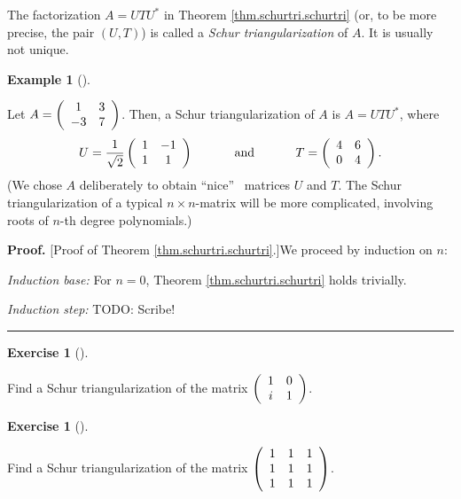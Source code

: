 \documentclass[numbers=enddot,12pt,final,onecolumn,notitlepage]{scrartcl}%
\newcounter{exer}
\numberwithin{exer}{subsection}
\theoremstyle{definition}
\newtheorem{exam}[theo]{Example}
\newenvironment{example}[1][]
{\begin{exam}[#1]\begin{leftbar}}
{\end{leftbar}\end{exam}}
\newtheorem{exmp}[exer]{Exercise}
\newenvironment{exercise}[1][]
{\begin{exmp}[#1]\begin{leftbar}}
{\end{leftbar}\end{exmp}}
\newenvironment{proof}[1][Proof]{\noindent\textbf{#1.} }{\ \rule{0.5em}{0.5em}}
\begin{document}
The factorization $A=UTU^{\ast}$ in Theorem \ref{thm.schurtri.schurtri} (or,
to be more precise, the pair $\left(  U,T\right)  $) is called a \emph{Schur
triangularization} of $A$. It is usually not unique.

\begin{example}
Let $A=\left(
\begin{array}
[c]{cc}%
1 & 3\\
-3 & 7
\end{array}
\right)  $. Then, a Schur triangularization of $A$ is $A=UTU^{\ast}$, where%
\[
U=\dfrac{1}{\sqrt{2}}\left(
\begin{array}
[c]{cc}%
1 & -1\\
1 & 1
\end{array}
\right)  \ \ \ \ \ \ \ \ \ \ \text{and}\ \ \ \ \ \ \ \ \ \ T=\left(
\begin{array}
[c]{cc}%
4 & 6\\
0 & 4
\end{array}
\right)  .
\]
(We chose $A$ deliberately to obtain \textquotedblleft nice\textquotedblright%
\ matrices $U$ and $T$. The Schur triangularization of a typical $n\times
n$-matrix will be more complicated, involving roots of $n$-th degree polynomials.)
\end{example}

\begin{proof}
[Proof of Theorem \ref{thm.schurtri.schurtri}.]We proceed by induction on $n$:

\textit{Induction base:} For $n=0$, Theorem \ref{thm.schurtri.schurtri} holds trivially.

\textit{Induction step:} TODO: Scribe!
\end{proof}

\begin{exercise}
\label{exe.schurtri.schurtri.one2x2} Find a Schur triangularization of
the matrix $\left(
\begin{array}
[c]{cc}%
1 & 0\\
i & 1
\end{array}
\right)  $.
\end{exercise}

\begin{exercise}
\label{exe.schurtri.schurtri.one3x3} Find a Schur triangularization of
the matrix $\left(
\begin{array}
[c]{ccc}%
1 & 1 & 1\\
1 & 1 & 1\\
1 & 1 & 1
\end{array}
\right)  $.
\end{exercise}
\end{document}
